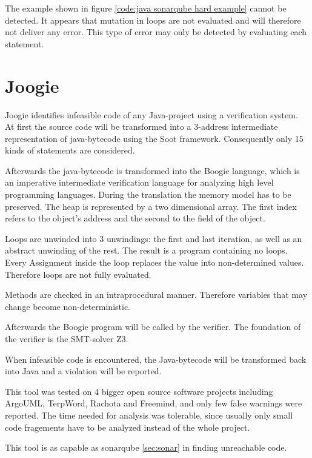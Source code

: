 The example shown in figure \ref{code:java sonarqube hard example} cannot be detected. It appears that mutation in loops are not evaluated and will therefore not deliver any error. This type of error may only be detected by evaluating each statement.

\section{Joogie}
\label{sec:sca paper}
Joogie \cite{arltJoogieInfeasibleCode2012, arltJoogieJavaJimple2013} identifies infeasible code of any Java-project using a verification system. 
At first the source code will be transformed into a 3-address intermediate representation of java-bytecode using the Soot framework. Consequently only 15 kinds of statements are considered. 

Afterwards the java-bytecode is transformed into the Boogie language, which is an imperative intermediate verification language for analyzing high level programming languages.
During the translation the memory model has to be preserved. The heap is represented by a two dimensional array. The first index refers to the object's address and the second to the field of the object.

Loops are unwinded into 3 unwindings: the first and last iteration, as well as an abstract unwinding of the rest.
The result is a program containing no loops. Every Assignment inside the loop replaces the value into non-determined values. Therefore loops are not fully evaluated.


Methods are checked in an intraprocedural manner. Therefore variables that may change become non-deterministic. 


Afterwards the Boogie program will be called by the verifier. 
The foundation of the verifier is the SMT-solver Z3.



When infeasible code is encountered, the Java-bytecode will be transformed back into Java and a violation will be reported.


This tool was tested on 4 bigger open source software projects including ArgoUML, TerpWord, Rachota and Freemind, and only few false warnings were reported.
The time needed for analysis was tolerable, since usually only small code fragements have to be analyzed instead of the whole project.

This tool is as capable as sonarqube \ref{sec:sonar} in finding unreachable code.

